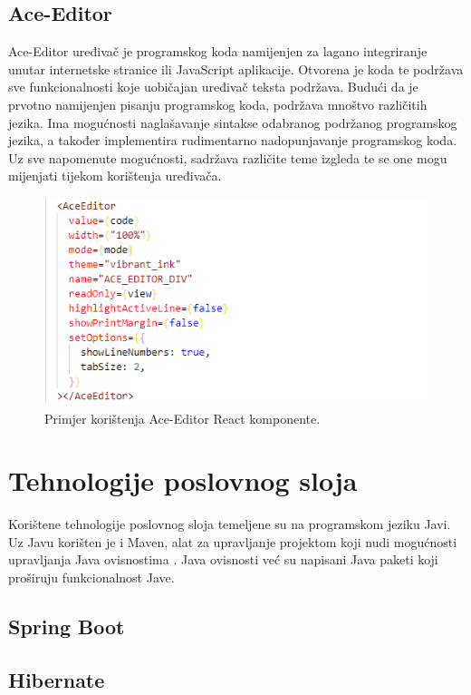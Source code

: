 \documentclass[times, utf8, zavrsni]{fer}
\begin{document}
		\subsection{Ace-Editor}
		Ace-Editor uređivač je programskog koda namijenjen za lagano integriranje unutar internetske stranice ili JavaScript aplikacije. Otvorena je koda te podržava sve funkcionalnosti koje uobičajan uređivač teksta podržava. Budući da je prvotno namijenjen pisanju programskog koda, podržava mnoštvo različitih jezika. Ima mogućnosti naglašavanje sintakse odabranog podržanog programskog jezika, a također implementira rudimentarno nadopunjavanje programskog koda. Uz sve napomenute mogućnosti, sadržava različite teme izgleda te se one mogu mijenjati tijekom korištenja uređivača.
		\begin{figure}[H]
			\centering
			\includegraphics[width=\linewidth]{pictures/prikazi/AceEditor.png}
			\caption{Primjer korištenja Ace-Editor React komponente.}
			\label{fig:ace}
		\end{figure}
		
	\section{Tehnologije poslovnog sloja}
	Korištene tehnologije poslovnog sloja temeljene su na programskom jeziku Javi. Uz Javu korišten je i Maven, alat za upravljanje projektom koji nudi mogućnosti upravljanja Java ovisnostima . Java ovisnosti već su napisani Java paketi koji proširuju funkcionalnost Jave.
		\subsection{Spring Boot}
	
		\subsection{Hibernate}
\end{document}
